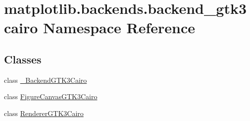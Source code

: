 \hypertarget{namespacematplotlib_1_1backends_1_1backend__gtk3cairo}{}\section{matplotlib.\+backends.\+backend\+\_\+gtk3cairo Namespace Reference}
\label{namespacematplotlib_1_1backends_1_1backend__gtk3cairo}
\subsection*{Classes}
\begin{DoxyCompactItemize}
\item 
class \hyperlink{classmatplotlib_1_1backends_1_1backend__gtk3cairo_1_1__BackendGTK3Cairo}{\+\_\+\+Backend\+G\+T\+K3\+Cairo}
\item 
class \hyperlink{classmatplotlib_1_1backends_1_1backend__gtk3cairo_1_1FigureCanvasGTK3Cairo}{Figure\+Canvas\+G\+T\+K3\+Cairo}
\item 
class \hyperlink{classmatplotlib_1_1backends_1_1backend__gtk3cairo_1_1RendererGTK3Cairo}{Renderer\+G\+T\+K3\+Cairo}
\end{DoxyCompactItemize}
